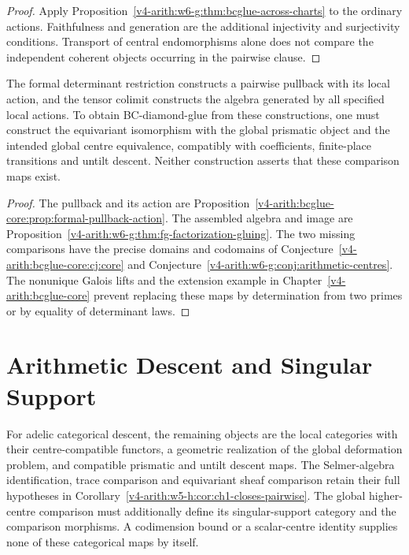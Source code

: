 \begin{proof}
Apply Proposition~\ref{v4-arith:w6-g:thm:bcglue-across-charts} to the
ordinary actions. Faithfulness and generation are the additional
injectivity and surjectivity conditions. Transport of central
endomorphisms alone does not compare the independent coherent
objects occurring in the pairwise clause.
\end{proof}

\begin{proposition}
\label{v4-arith:w6-g:cor:bcglue-final}
The formal determinant restriction constructs a pairwise pullback
with its local action, and the tensor colimit constructs the algebra
generated by all specified local actions.
To obtain BC-diamond-glue from these constructions, one must
construct the equivariant isomorphism with the global prismatic
object and the intended global centre equivalence, compatibly with
coefficients, finite-place transitions and untilt descent.
Neither construction asserts that these comparison maps exist.
\end{proposition}

\begin{proof}
The pullback and its action are
Proposition~\ref{v4-arith:bcglue-core:prop:formal-pullback-action}.
The assembled algebra and image are
Proposition~\ref{v4-arith:w6-g:thm:fg-factorization-gluing}.
The two missing comparisons have the precise domains and codomains
of Conjecture~\ref{v4-arith:bcglue-core:cj:core} and
Conjecture~\ref{v4-arith:w6-g:conj:arithmetic-centres}.
The nonunique Galois lifts and the extension example in
Chapter~\ref{v4-arith:bcglue-core} prevent replacing these maps
by determination from two primes or by equality of determinant laws.
\end{proof}

\section{Arithmetic Descent and Singular Support}
\label{v4-arith:w6-g:residuals}

\begin{remark}
\label{v4-arith:w6-g:thm:lacd-wave6}
\label{v4-arith:w6-g:rem:domain-delta}
For adelic categorical descent, the remaining objects are the local
categories with their centre-compatible functors, a geometric
realization of the global deformation problem, and compatible
prismatic and untilt descent maps. The Selmer-algebra identification,
trace comparison and equivariant sheaf comparison retain their full
hypotheses in
Corollary~\ref{v4-arith:w5-h:cor:ch1-closes-pairwise}.
The global higher-centre comparison must additionally define its
singular-support category and the comparison morphisms.
A codimension bound or a scalar-centre identity supplies none of
these categorical maps by itself.
\end{remark}

